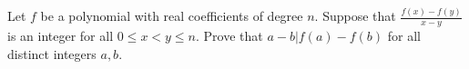 Let $f$ be a polynomial with real coefficients of degree $n$. Suppose that $\displaystyle \frac{f(x)-f(y)}{x-y}$ is an integer for all $0 \leq x<y \leq n$. Prove that $a-b | f(a)-f(b)$ for all distinct integers $a,b$.